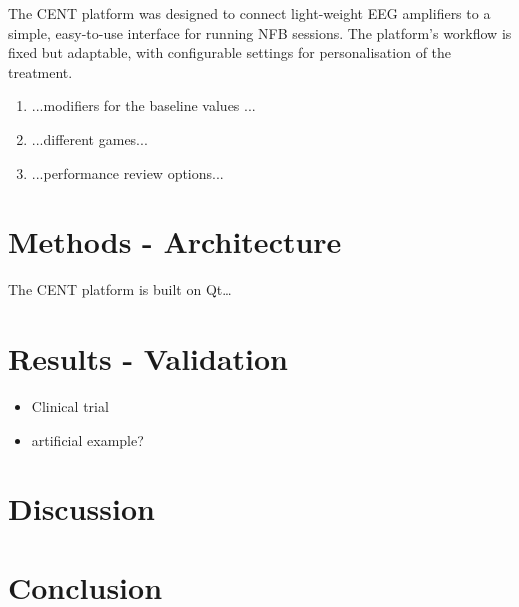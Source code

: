 \documentclass[fleqn,10pt]{wlpeerj}
\begin{document}
The CENT platform was designed to connect light-weight EEG amplifiers to a simple, easy-to-use interface for running NFB sessions. The platform's workflow is fixed but adaptable, with configurable settings for personalisation of the treatment. 
\begin{enumerate}
	\item ...modifiers for the baseline values ...
	\item ...different games...
	\item ...performance review options...
\end{enumerate}




\section{Methods - Architecture}

The CENT platform is built on Qt…




\section{Results - Validation}

\begin{itemize}
	\item Clinical trial
	
	\item artificial example?
	
\end{itemize}





\section{Discussion}

\lipsum[10] %





\section{Conclusion}
\end{document}
